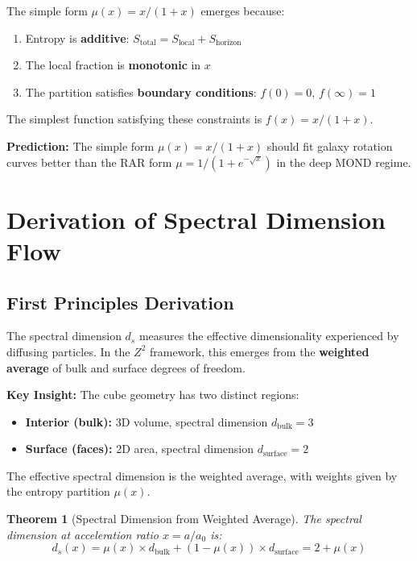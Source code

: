 \documentclass[11pt,a4paper]{article}
\theoremstyle{plain}
\newtheorem{theorem}{Theorem}[section]
\theoremstyle{definition}
\theoremstyle{remark}
\begin{document}
The simple form $\mu(x) = x/(1+x)$ emerges because:
\begin{enumerate}
  \item Entropy is \textbf{additive}: $S_{\text{total}} = S_{\text{local}} + S_{\text{horizon}}$
  \item The local fraction is \textbf{monotonic} in $x$
  \item The partition satisfies \textbf{boundary conditions}: $f(0) = 0$, $f(\infty) = 1$
\end{enumerate}

The simplest function satisfying these constraints is $f(x) = x/(1+x)$.

\textbf{Prediction:} The simple form $\mu(x) = x/(1+x)$ should fit galaxy rotation curves better than the RAR form $\mu = 1/(1 + e^{-\sqrt{x}})$ in the deep MOND regime.

\section{Derivation of Spectral Dimension Flow}

\subsection{First Principles Derivation}

The spectral dimension $d_s$ measures the effective dimensionality experienced by diffusing particles. In the $Z^2$ framework, this emerges from the \textbf{weighted average} of bulk and surface degrees of freedom.

\textbf{Key Insight:} The cube geometry has two distinct regions:
\begin{itemize}
  \item \textbf{Interior (bulk):} 3D volume, spectral dimension $d_{\text{bulk}} = 3$
  \item \textbf{Surface (faces):} 2D area, spectral dimension $d_{\text{surface}} = 2$
\end{itemize}

The effective spectral dimension is the weighted average, with weights given by the entropy partition $\mu(x)$.

\begin{theorem}[Spectral Dimension from Weighted Average]
The spectral dimension at acceleration ratio $x = a/a_0$ is:
\[
d_s(x) = \mu(x) \times d_{\text{bulk}} + (1-\mu(x)) \times d_{\text{surface}} = 2 + \mu(x)
\]
\end{theorem}
\end{document}
